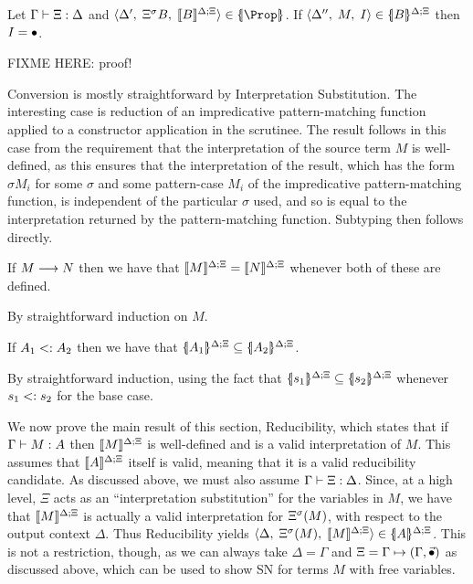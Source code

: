 \documentclass{article}
\begin{document}
\begin{lemma}
  \label{lemma:proof-irrelevance}
  Let $\ivtypej{\Xi}{\Delta}$ and
  $\triple{\Delta'}{\Dsubst{B}}{\interp{B}}\in\interpd[]{\Prop}$.  If
  $\triple{\Delta''}{M}{I}\in\interpd{B}$ then $I=\dummy$.
\end{lemma}

\iftechreport
FIXME HERE: proof!
\fi

Conversion is mostly straightforward by Interpretation
Substitution. The interesting case is reduction of an impredicative
pattern-matching function applied to a constructor application in the
scrutinee. The result follows in this case from the requirement that
the interpretation of the source term $M$ is well-defined, as this
ensures that the interpretation of the result, which has the form
$\sigma M_i$ for some $\sigma$ and some pattern-case $M_i$ of the
impredicative pattern-matching function, is independent of the
particular $\sigma$ used, and so is equal to the interpretation
returned by the pattern-matching function. Subtyping then follows
directly.


\begin{lemma}[Conversion]
  \label{lemma:interp-eq}
  If $M\rrto N$ then we have that $\interp{M}=\interp{N}$ whenever both of these
  are defined.
\end{lemma}

\iftechreport
\begin{myproof}
  By straightforward induction on $M$.
\end{myproof}
\fi


\begin{lemma}[Subtyping]
  \label{lemma:subtyping}
  If $A_1\subtype A_2$ then we have that $\interpd{A_1}\subseteq\interpd{A_2}$.
\end{lemma}

\iftechreport
\begin{myproof}
  By straightforward induction, using the fact that
  $\interpd{s_1}\subseteq\interpd{s_2}$ whenever $s_1\subtype s_2$ for
  the base case.
\end{myproof}
\fi


We now prove the main result of this section, Reducibility, which
states that if $\typej{M}{A}$ then $\interp{M}$ is well-defined and is
a valid interpretation of $M$.  This assumes that $\interp{A}$ itself
is valid, meaning that it is a valid reducibility candidate. As
discussed above, we must also assume $\ivtypej{\Xi}{\Delta}$.  Since,
at a high level, $\Xi$ acts as an ``interpretation substitution'' for
the variables in $M$, we have that $\interp{M}$ is actually a valid
interpretation for $\Dsubst(M)$, with respect to the output context
$\Delta$.  Thus Reducibility yields
$\triple{\Delta}{\Dsubst(M)}{\interp{M}}\in\interpd{A}$.  This is not
a restriction, though, as we can always take $\Delta=\Gamma$ and
$\Xi=\dgform[\Gamma]{\Gamma}{\vec{\dummy}}$ as discussed above,
which can be used to show SN for terms $M$ with free variables.
\end{document}
